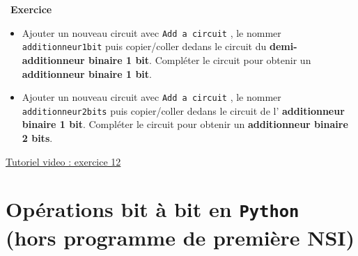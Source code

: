 \documentclass[
  11pt,
]{article}
\newcommand{\passthrough}[1]{#1}
\providecommand{\tightlist}{%
  \setlength{\itemsep}{0pt}\setlength{\parskip}{0pt}}
\newcounter{exo}
\newenvironment{exercice}[1]
{\par \medskip   \addtocounter{exo}{1} \noindent  
\begin{bclogo}[arrondi =0.1,   noborder = true, logo=\bccrayon, marge=4]{~\textbf{Exercice} \textbf{\theexo} {\itshape #1} }  \par}
{
\end{bclogo}
 \par \bigskip }
\newcounter{prog}
\begin{document}
\begin{exercice}{}
\begin{enumerate}
  \begin{itemize}
  \tightlist
  \item
    Ajouter un nouveau circuit avec
    \passthrough{\lstinline!Add a circuit!} , le nommer
    \passthrough{\lstinline!additionneur1bit!} puis copier/coller dedans
    le circuit du \textbf{demi-additionneur binaire 1 bit}. Compléter le
    circuit pour obtenir un \textbf{additionneur binaire 1 bit}.
  \item
    Ajouter un nouveau circuit avec
    \passthrough{\lstinline!Add a circuit!} , le nommer
    \passthrough{\lstinline!additionneur2bits!} puis copier/coller
    dedans le circuit de l' \textbf{additionneur binaire 1 bit}.
    Compléter le circuit pour obtenir un \textbf{additionneur binaire 2
    bits}.
  \end{itemize}
\end{enumerate}

\href{videos/exercice12.mp4}{Tutoriel video : exercice 12}

\end{exercice}

\hypertarget{opuxe9rations-bit-uxe0-bit-en-python-hors-programme-de-premiuxe8re-nsi}{%
\section{\texorpdfstring{Opérations bit à bit en \texttt{Python} (hors
programme de première
NSI)}{Opérations bit à bit en Python (hors programme de première NSI)}}\label{opuxe9rations-bit-uxe0-bit-en-python-hors-programme-de-premiuxe8re-nsi}}
\end{document}
